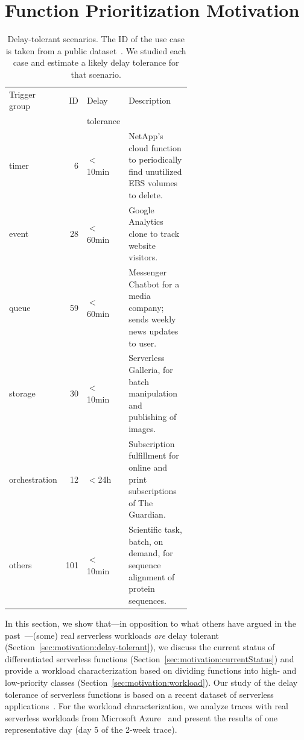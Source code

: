 \section{Function Prioritization Motivation}
\label{sec:qos:motivation}

\begin{table}
  \caption{Delay-tolerant scenarios. The ID of the use case is taken from a public dataset~\cite{Eismann:zenodo:2021:dataset}. We studied each case and estimate a likely delay tolerance for that scenario.}
  \label{tab:examples}
  \centering
  \begin{tabular}{lrlp{0.6\linewidth}}
    \hline
    Trigger group & ID & Delay     & Description \\
                  &    & tolerance & \\
    \hline
    timer & 6 & $<$10min & NetApp's cloud function to periodically find unutilized EBS volumes to delete. \\
    event & 28 & $<$60min & Google Analytics clone to track website visitors. \\ %
    queue & 59 & $<$60min & Messenger Chatbot for a media company; sends weekly news updates to user. \\
    storage & 30 & $<$10min & Serverless Galleria, for batch manipulation and publishing of images. \\
    orchestration & 12 & $<$24h & Subscription fulfillment for online and print subscriptions of The Guardian. \\
    others & 101 & $<$10min & Scientific task, batch, on demand, for sequence alignment of protein sequences. \\
  \hline
\end{tabular}
\end{table}

In this section, we show that---in opposition to what others have argued in the past~\cite{Wiesner:Middleware:2021:TemporalShifting}---(some) real serverless workloads \emph{are} delay tolerant (Section~\ref{sec:motivation:delay-tolerant}), we discuss the current status of differentiated serverless functions (Section~\ref{sec:motivation:currentStatus}) and provide a workload characterization based on dividing functions into high- and low-priority classes (Section~\ref{sec:motivation:workload}).
Our study of the delay tolerance of serverless functions is based on a recent dataset of serverless applications~\cite{Eismann:Software:2021:Why,Eismann:TSE:2021:CommunityConsensus}.
For the workload characterization, we analyze traces with real serverless workloads from Microsoft Azure~\cite{shahrad2020serverless} and present the results of one representative day (day 5 of the 2-week trace).

